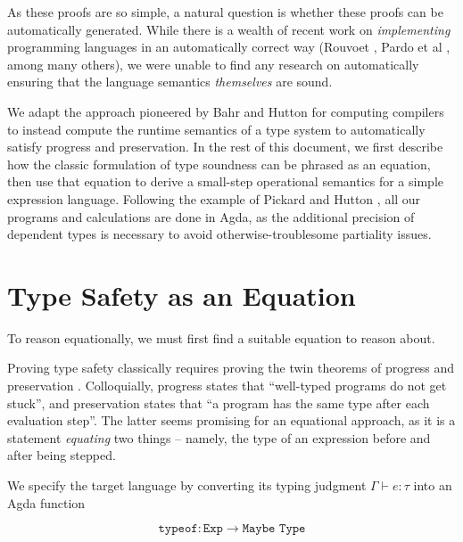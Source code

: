\documentclass[manuscript,screen,review,sigplan]{acmart}
\begin{document}

As these proofs are so simple, a natural question is whether these proofs can
be automatically generated. While there is a wealth of recent work on
\emph{implementing} programming languages in an automatically correct way
(Rouvoet \cite{rouvoet:2021}, Pardo et al \cite{pardoetal:2018}, among many
others), we were unable to find any research on automatically ensuring that the
language semantics \emph{themselves} are sound.

We adapt the approach pioneered by Bahr and Hutton \cite{bahr:2015} for
computing compilers to instead compute the runtime semantics of a type system
to automatically satisfy progress and preservation.
In the rest of this document, we first describe how the classic formulation of
type soundness can be phrased as an equation, then use that equation to
derive a small-step operational semantics for a simple expression language.
Following the example of Pickard and Hutton \cite{pickard:2021}, all our
programs and calculations are done in Agda, as the additional precision of
dependent types is necessary to avoid otherwise-troublesome partiality issues.

\section{Type Safety as an Equation}

To reason equationally, we must first find a suitable equation to reason about.

Proving type safety classically requires proving the twin theorems of
progress and preservation \cite{harper:pfpl}. Colloquially, progress states
that ``well-typed programs do not get stuck'', and preservation states that
``a program has the same type after each evaluation step''. The latter seems
promising for an equational approach, as it is a statement \emph{equating} two
things -- namely, the type of an expression before and after being stepped.

We specify the target language by converting its typing judgment $\Gamma
\vdash e : \tau$ into an Agda function

\begin{equation}
  \texttt{typeof} : \texttt{Exp} \rightarrow \texttt{Maybe Type}
\end{equation}
\end{document}
